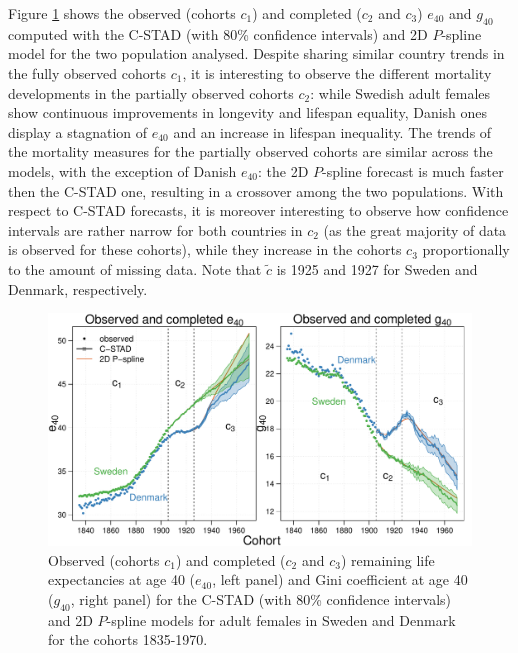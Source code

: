 \documentclass[11pt, a4paper]{article}
\begin{document}
Figure \ref{Fig:CSTADforeE40G40} shows the observed (cohorts $c_1$) and completed ($c_2$ and $c_3$) $e_{40}$ and $g_{40}$ computed with the C-STAD (with 80\% confidence intervals) and 2D $P$-spline model for the two population analysed. Despite sharing similar country trends in the fully observed cohorts $c_1$, it is interesting to observe the different mortality developments in the partially observed cohorts $c_2$: while Swedish adult females show continuous improvements in longevity and lifespan equality, Danish ones display a stagnation of $e_{40}$ and an increase in lifespan inequality. The trends of the mortality measures for the partially observed cohorts are similar across the models, with the exception of Danish $e_{40}$: the 2D $P$-spline forecast is much faster then the C-STAD one, resulting in a crossover among the two populations. With respect to C-STAD forecasts, it is moreover interesting to observe how confidence intervals are rather narrow for both countries in $c_2$ (as the great majority of data is observed for these cohorts), while they increase in the cohorts $c_3$ proportionally to the amount of missing data. Note that $\tilde{c}$ is 1925 and 1927 for Sweden and Denmark, respectively.  

\begin{figure}[t]
	\begin{center}
		\includegraphics[scale=0.57]{./Figures/F5.pdf} 
		\caption{Observed (cohorts $c_1$) and completed ($c_2$ and $c_3$) remaining life expectancies at age 40 ($e_{40}$, left panel) and Gini coefficient at age 40 ($g_{40}$, right panel) for the C-STAD (with 80\% confidence intervals) and 2D $P$-spline models for adult females in Sweden and Denmark for the cohorts 1835-1970.\label{Fig:CSTADforeE40G40}}    
	\end{center}
\end{figure}
\end{document}
